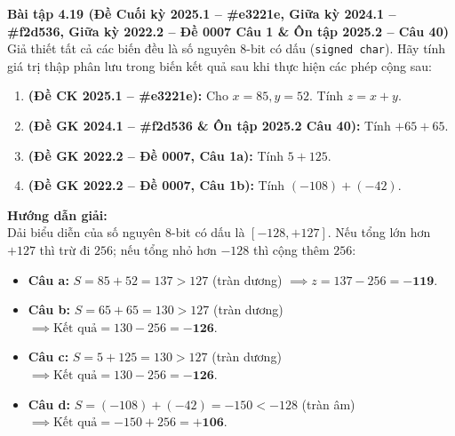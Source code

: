 \textbf{Bài tập 4.19 (Đề Cuối kỳ 2025.1 -- \#e3221e, Giữa kỳ 2024.1 -- \#f2d536, Giữa kỳ 2022.2 -- Đề 0007 Câu 1 \& Ôn tập 2025.2 -- Câu 40)}\\
Giả thiết tất cả các biến đều là số nguyên 8-bit có dấu (\texttt{signed char}). Hãy tính giá trị thập phân lưu trong biến kết quả sau khi thực hiện các phép cộng sau:
\begin{enumerate}[label=\alph*)]
    \item \textbf{(Đề CK 2025.1 -- \#e3221e):} Cho $x = 85, y = 52$. Tính $z = x + y$.
    \item \textbf{(Đề GK 2024.1 -- \#f2d536 \& Ôn tập 2025.2 Câu 40):} Tính $+65 + 65$.
    \item \textbf{(Đề GK 2022.2 -- Đề 0007, Câu 1a):} Tính $5 + 125$.
    \item \textbf{(Đề GK 2022.2 -- Đề 0007, Câu 1b):} Tính $(-108) + (-42)$.
\end{enumerate}
\textbf{Hướng dẫn giải:}\\
Dải biểu diễn của số nguyên 8-bit có dấu là $[-128, +127]$. Nếu tổng lớn hơn $+127$ thì trừ đi $256$; nếu tổng nhỏ hơn $-128$ thì cộng thêm $256$:
\begin{itemize}
    \item \textbf{Câu a:} $S = 85 + 52 = 137 > 127$ (tràn dương) $\implies z = 137 - 256 = \mathbf{-119}$.
    \item \textbf{Câu b:} $S = 65 + 65 = 130 > 127$ (tràn dương) $\implies \text{Kết quả} = 130 - 256 = \mathbf{-126}$.
    \item \textbf{Câu c:} $S = 5 + 125 = 130 > 127$ (tràn dương) $\implies \text{Kết quả} = 130 - 256 = \mathbf{-126}$.
    \item \textbf{Câu d:} $S = (-108) + (-42) = -150 < -128$ (tràn âm) $\implies \text{Kết quả} = -150 + 256 = \mathbf{+106}$.
\end{itemize}

